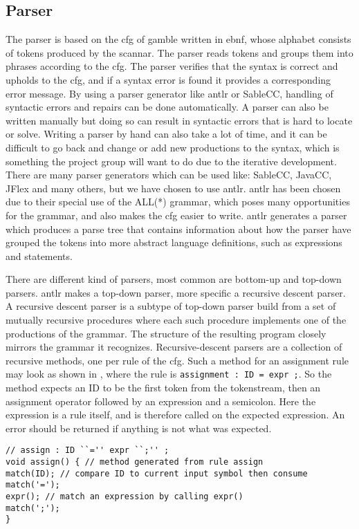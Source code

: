 \subsection*{Parser}\label{subsec:parser}
The parser is based on the \acrfull{cfg} of \gls{gamble} written in \acrfull{ebnf}, whose alphabet consists of tokens produced by the scannar.
The parser reads tokens and groups them into phrases according to the \acrshort{cfg}.
The parser verifies that the syntax is correct and upholds to the \acrshort{cfg}, and if a syntax error is found it provides a corresponding error message. \citep{Crafting_book}
By using a parser generator like \acrshort{antlr} or SableCC, handling of syntactic errors and repairs can be done automatically.
A parser can also be written manually but doing so can result in syntactic errors that is hard to locate or solve.
Writing a parser by hand can also take a lot of time, and it can be difficult to go back and change or add new productions to the syntax, which is something the project group will want to do due to the iterative development.
There are many parser generators which can be used like: SableCC, JavaCC, JFlex and many others, but we have chosen to use \acrshort{antlr}.
\acrshort{antlr} has been chosen due to their special use of the ALL(*) grammar, which poses many opportunities for the grammar, and also makes the \acrshort{cfg} easier to write.
\acrshort{antlr} generates a parser which produces a parse tree that contains information about how the parser have grouped the tokens into more abstract language definitions, such as expressions and statements.

There are different kind of parsers, most common are bottom-up and top-down parsers.
\acrshort{antlr} makes a top-down parser, more specific a recursive descent parser.
A recursive descent parser is a subtype of top-down parser build from a set of mutually recursive procedures where each such procedure implements one of the productions of the grammar.
The structure of the resulting program closely mirrors the grammar it recognizes. \citep{Recursive_programming}
Recursive-descent parsers are a collection of recursive methods, one per rule of the \acrshort{cfg}.
Such a method for an assignment rule may look as shown in , where the rule is \texttt{assignment : ID = expr ;}.
So the method expects an ID to be the first token from the tokenstream, then an assignment operator followed by an expression and a semicolon.
Here the expression is a rule itself, and is therefore called on the expected expression.
An error should be returned if anything is not what was expected.
\begin{lstlisting}[caption=Example a recursive descent parser method,frame=tlrb,label={lst:rdpmethod}]
// assign : ID ``='' expr ``;'' ;
void assign() { // method generated from rule assign
match(ID); // compare ID to current input symbol then consume
match('=');
expr(); // match an expression by calling expr()
match(';');
}
\end{lstlisting}

